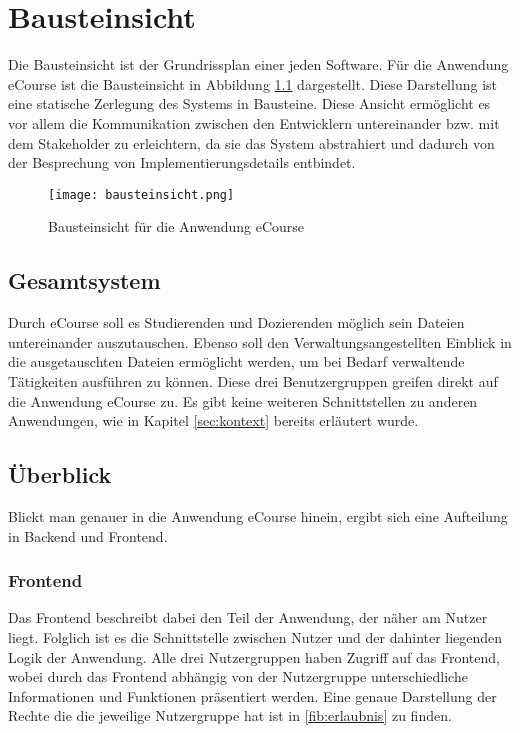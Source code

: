 \chapter{Bausteinsicht}
\label{sec:bausteine}
Die Bausteinsicht ist der Grundrissplan einer jeden Software. Für die Anwendung eCourse ist die Bausteinsicht in Abbildung \ref{fib:Bausteinsicht} dargestellt.
Diese Darstellung ist eine statische Zerlegung des Systems in Bausteine. Diese Ansicht ermöglicht es vor allem die Kommunikation zwischen den Entwicklern untereinander bzw. mit dem Stakeholder zu erleichtern, da sie das System abstrahiert und dadurch von der Besprechung von Implementierungsdetails entbindet.

\begin{figure}[H]
\centering
\texttt{[image: bausteinsicht.png]}
\caption{Bausteinsicht für die Anwendung eCourse}
\label{fib:Bausteinsicht}
\end{figure}

\section{Gesamtsystem}
Durch eCourse soll es \gls{Studierende}n und \gls{Dozierende}n möglich sein Dateien untereinander auszutauschen. Ebenso soll den Verwaltungsangestellten Einblick in die ausgetauschten Dateien ermöglicht werden, um bei Bedarf verwaltende Tätigkeiten ausführen zu können. Diese drei Benutzergruppen greifen direkt auf die Anwendung eCourse zu. Es gibt keine weiteren Schnittstellen zu anderen Anwendungen, wie in Kapitel \ref{sec:kontext} bereits erläutert wurde. 

\section{Überblick}
Blickt man genauer in die Anwendung eCourse hinein, ergibt sich eine Aufteilung in \gls{Backend} und \gls{Frontend}.

\subsection{Frontend}
Das \gls{Frontend} beschreibt dabei den Teil der Anwendung, der näher am Nutzer liegt. Folglich ist es die Schnittstelle zwischen Nutzer und der dahinter liegenden Logik der Anwendung. Alle drei Nutzergruppen haben Zugriff auf das \gls{Frontend}, wobei durch das \gls{Frontend} abhängig von der Nutzergruppe unterschiedliche Informationen und Funktionen präsentiert werden. Eine genaue Darstellung der Rechte die die jeweilige Nutzergruppe hat ist in \ref{fib:erlaubnis} zu finden.

